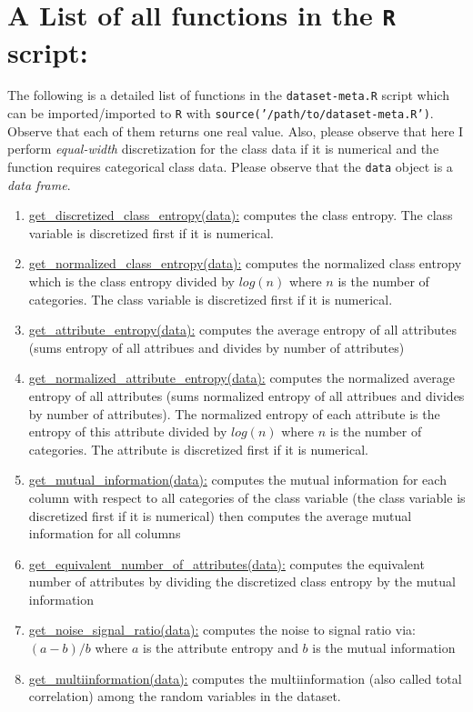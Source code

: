 \documentclass[a4paper,12pt, english]{article}
\begin{document}
\section{A List of all functions in the \texttt{R} script:}
The following is a detailed list of functions in the \texttt{dataset-meta.R} script which can be imported/imported to \texttt{R} with \texttt{source('/path/to/dataset-meta.R')}. Observe that each of them returns one real value. Also, please observe that here I perform \emph{equal-width} discretization for the class data if it is numerical and the function requires categorical class data. Please observe that the \texttt{data} object is a \emph{data frame}.
\begin{enumerate}
	
	\item \underline{get\_discretized\_class\_entropy(data):} computes the class entropy. The class variable is discretized first if it is numerical.
	\item \underline{get\_normalized\_class\_entropy(data):} computes the normalized class entropy which is the class entropy divided by $log(n)$ where $n$ is the number of categories. The class variable is discretized first if it is numerical.
	\item \underline{get\_attribute\_entropy(data):} computes the average entropy of all attributes (sums entropy of all attribues and divides by number of attributes)
	\item \underline{get\_normalized\_attribute\_entropy(data):} computes the normalized average entropy of all attributes (sums normalized entropy of all attribues and divides by number of attributes). The normalized entropy of each attribute is the entropy of this attribute divided by $log(n)$ where $n$ is the number of categories. The attribute is discretized first if it is numerical.
	\item \underline{get\_mutual\_information(data):} computes the mutual information for each column with respect to all categories of the class variable (the class variable is discretized first if it is numerical) then computes the average mutual information for all columns
	\item \underline{get\_equivalent\_number\_of\_attributes(data):} computes the equivalent number of attributes by dividing the discretized class entropy by the mutual information
	\item \underline{get\_noise\_signal\_ratio(data):} computes the noise to signal ratio via: $(a-b)/b$ where $a$ is the attribute entropy and $b$ is the mutual information
	\item \underline{get\_multiinformation(data):} computes the multiinformation (also called total correlation) among the random variables in the dataset.
	
	
	
\end{enumerate}    
\end{document}

